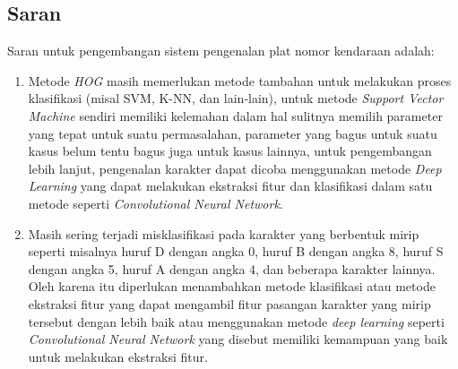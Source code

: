 \subsection{Saran}
\noindent Saran untuk pengembangan sistem pengenalan plat nomor kendaraan adalah:
\begin{enumerate}
\item Metode \textit{HOG} masih memerlukan metode tambahan untuk melakukan proses klasifikasi (misal SVM, K-NN, dan lain-lain), untuk metode \textit{Support Vector Machine} sendiri memiliki kelemahan dalam hal sulitnya memilih parameter yang tepat untuk suatu permasalahan, parameter yang bagus untuk suatu kasus belum tentu bagus juga untuk kasus lainnya, untuk pengembangan lebih lanjut, pengenalan karakter dapat dicoba menggunakan metode \textit{Deep Learning} yang dapat melakukan ekstraksi fitur dan klasifikasi dalam satu metode seperti \textit{Convolutional Neural Network}.
\item Masih sering terjadi misklasifikasi pada karakter yang berbentuk mirip seperti misalnya huruf D dengan angka 0, huruf B dengan angka 8, huruf S dengan angka 5, huruf A dengan angka 4, dan beberapa karakter lainnya. Oleh karena itu diperlukan menambahkan metode klasifikasi atau metode ekstraksi fitur yang dapat mengambil fitur pasangan karakter yang mirip tersebut dengan lebih baik atau menggunakan metode \textit{deep learning} seperti \textit{Convolutional Neural Network} yang disebut memiliki kemampuan yang baik untuk melakukan ekstraksi fitur.
\end{enumerate}

\newpage